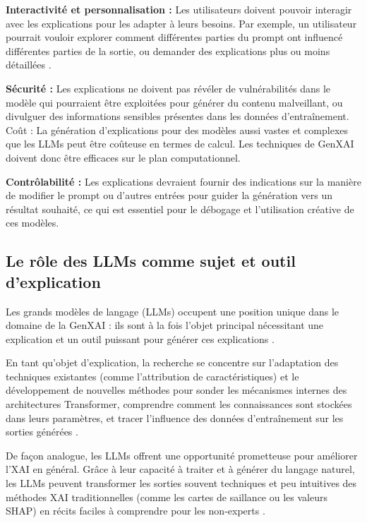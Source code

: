 \textbf{Interactivité et personnalisation :} Les utilisateurs doivent pouvoir interagir avec les explications pour les adapter à leurs besoins. Par exemple, un utilisateur pourrait vouloir explorer comment différentes parties du prompt ont influencé différentes parties de la sortie, ou demander des explications plus ou moins détaillées \citep{Schwalbe2024Interactive, Schneider2019}.

\textbf{Sécurité :} Les explications ne doivent pas révéler de vulnérabilités dans le modèle qui pourraient être exploitées pour générer du contenu malveillant, ou divulguer des informations sensibles présentes dans les données d'entraînement.
Coût : La génération d'explications pour des modèles aussi vastes et complexes que les LLMs peut être coûteuse en termes de calcul. Les techniques de GenXAI doivent donc être efficaces sur le plan computationnel.

\textbf{Contrôlabilité :} Les explications devraient fournir des indications sur la manière de modifier le prompt ou d'autres entrées pour guider la génération vers un résultat souhaité, ce qui est essentiel pour le débogage et l'utilisation créative de ces modèles.
\subsection{Le rôle des LLMs comme sujet et outil d'explication}
Les grands modèles de langage (LLMs) occupent une position unique dans le domaine de la GenXAI : ils sont à la fois l'objet principal nécessitant une explication et un outil puissant pour générer ces explications \citep{Singh2024, Liao2020Humancentered}.

En tant qu'objet d'explication, la recherche se concentre sur l'adaptation des techniques existantes (comme l'attribution de caractéristiques) et le développement de nouvelles méthodes pour sonder les mécanismes internes des architectures Transformer, comprendre comment les connaissances sont stockées dans leurs paramètres, et tracer l'influence des données d'entraînement sur les sorties générées \citep{Zhao2024Explainable, Luo2024A}.

De façon analogue, les LLMs offrent une opportunité prometteuse pour améliorer l'XAI en général. Grâce à leur capacité à traiter et à générer du langage naturel, les LLMs peuvent transformer les sorties souvent techniques et peu intuitives des méthodes XAI traditionnelles (comme les cartes de saillance ou les valeurs SHAP) en récits faciles à comprendre pour les non-experts \citet{Norori2019Explainable}.

